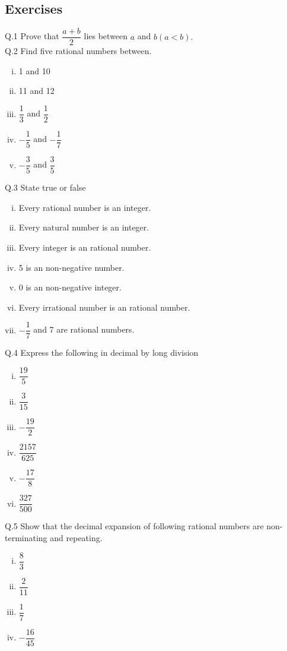 \subsection{Exercises}
Q.1 Prove that $\dfrac{a+b}{2}$ lies between $a$ and $b (a < b).$\\
Q.2 {Find five rational numbers between.}
\begin{multicols}{5}
\begin{enumerate}[(i)]
\item 1 and 10
\item 11 and 12
\item $\dfrac{1}{3}$ and $\dfrac{1}{2}$
\item $-\dfrac{1}{5}$ and $-\dfrac{1}{7}$
\item $-\dfrac{3}{5}$ and $\dfrac{3}{5}$  
\end{enumerate}
\end{multicols}
\noindent Q.3 {State true or false}
\begin{enumerate}[(i)]
\item Every rational number is an integer.
\item Every natural number is an integer.
\item Every integer is an rational number.
\item 5 is an non-negative number.
\item 0 is an non-negative integer.
\item Every irrational number is an rational number.
\item $-\dfrac{1}{7}$ and 7 are rational numbers.
\end{enumerate}
Q.4 {Express the following in decimal by long division}
\begin{multicols}{5}
\begin{enumerate}[(i)]
\item $\dfrac{19}{5}$
\item $\dfrac{3}{15}$
\item $-\dfrac{19}{2}$
\item $\dfrac{2157}{625}$
\item $-\dfrac{17}{8}$
\item $\dfrac{327}{500}$
\end{enumerate}
\end{multicols}
\noindent Q.5 {Show that the decimal expansion of following rational
numbers are non-terminating and
repeating.}
\begin{multicols}{4}
\begin{enumerate}[(i)]
 \item $\dfrac{8}{3}$
 \item $\dfrac{2}{11}$
 \item $\dfrac{1}{7}$
 \item $-\dfrac{16}{45}$
\end{enumerate}
\end{multicols}
